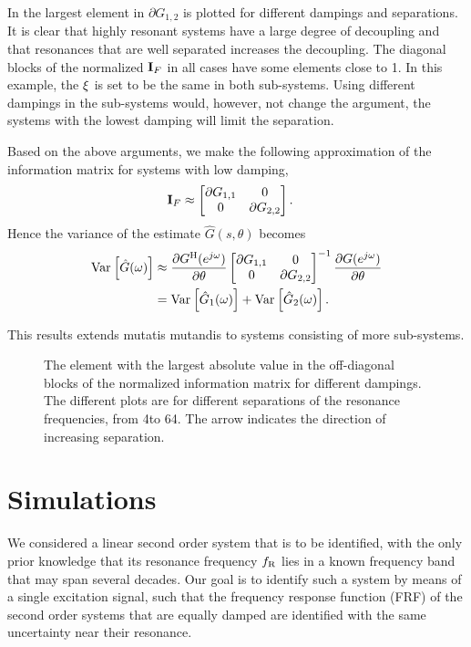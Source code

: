 In  the largest element in $\partial G_{1,2}$ is plotted for different dampings and separations. It is clear that highly resonant systems have a large degree of decoupling and that resonances that are well separated increases the decoupling. The diagonal blocks of the normalized $\mathbf{I}_F$ in all cases have some elements close to 1. In this example, the $\xi$ is set to be the same in both sub-systems. Using different dampings in the sub-systems would, however, not change the argument, the systems with the lowest damping will limit the separation.

Based on the above arguments, we make the following approximation of the information matrix for systems with low damping,
\begin{align}
\mathbf{I}_F&\approx \begin{bmatrix}\partial G_{1,1} &0\\
                        0&\partial G_{2,2}\end{bmatrix}.
\end{align}
Hence the variance of the estimate $\hat{G}(s,\theta)$ becomes
\begin{align}
\operatorname{\mathrm{Var}}_{} \left[ \hat{G}(\omega) \right] &\approx \frac{\partial G^{\mathrm{H}}(e^{j\omega})}{\partial \theta}\begin{bmatrix}\partial G_{1,1} &0\\
                        0&\partial G_{2,2}\end{bmatrix}^{-1}\frac{\partial G(e^{j\omega})}{\partial \theta}\\
&=\operatorname{\mathrm{Var}}_{} \left[ \hat{G}_1(\omega) \right] + \operatorname{\mathrm{Var}}_{} \left[ \hat{G}_2(\omega) \right].
\end{align}

This results extends mutatis mutandis to systems consisting of more sub-systems.

\begin{figure}
\centering

\caption{The element with the largest absolute value in the off-diagonal blocks of the normalized information matrix for different dampings.
         The different plots are for different separations of the resonance frequencies, from 4\wdB to 64\wdB.
         The arrow indicates the direction of increasing separation.}
\label{fig:coupling}
\end{figure}

\section{Simulations}\label{sec:sim}
We considered a linear second order system that is to be identified, with the
only prior knowledge that its resonance frequency $f_{\mathrm{R}}$ lies in a known
frequency band that may span several decades. 
Our goal is to identify such a system by means of a single excitation signal, 
such that the frequency response function (FRF) of the second order systems that are
equally damped are identified with the same uncertainty near their resonance.

